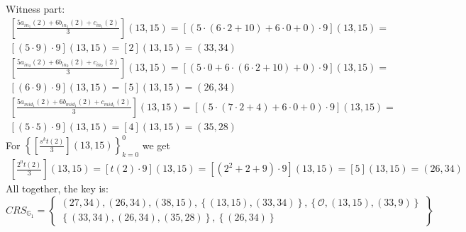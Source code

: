 \begin{example}
Witness part:
\begin{multline*}
\left[\frac{5 a_{in_1}(2)+6 b_{in_1}(2)+c_{in_1}(2)}{3}\right](13,15) = 
\left[(5\cdot (6\cdot 2 +10) +6\cdot 0 +0 )\cdot 9\right](13,15) = \\
\left[(5\cdot 9)\cdot 9\right](13,15) =
\left[2\right](13,15) = (33,34)
\end{multline*}
\begin{multline*}
\left[\frac{5 a_{in_2}(2)+6 b_{in_2}(2)+c_{in_2}(2)}{3}\right](13,15) = 
\left[(5\cdot 0 +6\cdot (6\cdot 2 + 10) + 0 )\cdot 9\right](13,15) = \\
\left[(6\cdot 9)\cdot 9\right](13,15) =
\left[5\right](13,15) =
(26,34)
\end{multline*}
\begin{multline*}
\left[\frac{5 a_{mid_1}(2)+6 b_{mid_1}(2)+c_{mid_1}(2)}{3}\right](13,15) = 
\left[(5\cdot (7\cdot 2 + 4) +6\cdot 0 + 0 )\cdot 9\right](13,15) = \\
\left[(5\cdot 5)\cdot 9\right](13,15) =
\left[4\right](13,15) =
(35,28)
\end{multline*}
For $\left\{\left[\frac{s^{k}t(2)}{3}\right](13,15)\right\} _{k=0}^{0}$ we get
\begin{multline*}
\left[\frac{2^{0}t(2)}{3}\right](13,15)=
[t(2)\cdot 9](13,15)= 
[(2^2+2+9)\cdot 9](13,15)= 
[5](13,15) =
(26,34)
\end{multline*}
All together, the key is:
$$
CRS_{\mathbb{G}_{1}}=\left\{ \begin{array}{c}
(27,34),(26,34),(38,15),\left\{(13,15),(33,34)\right\},
\left\{\mathcal{O}, (13,15), (33,9)\right\}\\
\left\{(33,34),(26,34),(35,28)\right\},
\left\{(26,34)\right\}
\end{array}\right\}
$$


\end{example}

